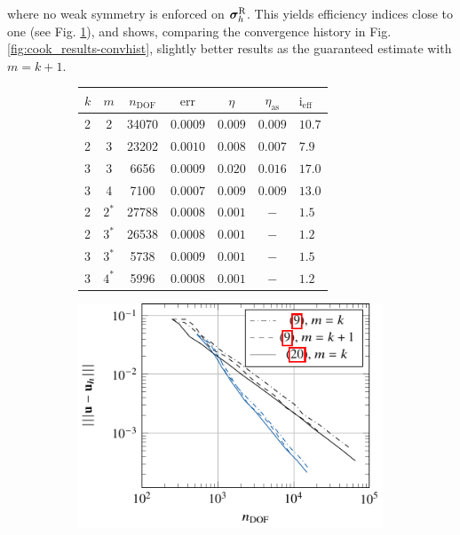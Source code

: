where no weak symmetry is enforced on $\bm{\sigma}^{\mathrm{R}}_h$.
This yields efficiency indices close to one (see Fig. \ref{fig:cook_results-summary}), and shows, comparing the convergence history in Fig. \ref{fig:cook_results-convhist}, slightly better results as the guaranteed estimate with $m=k+1$.
\begin{figure}
    \centering
    \begin{subfigure}[b]{0.4\textwidth}
        \begin{tabular}{@{}l|c|c|ccc|l@{}}
            \toprule
            $k$ & $m$ & $n_\mathrm{DOF}$ & $\mathrm{err}$ & $\eta$ & $\eta _\mathrm{as}$ & $\mathrm{i_{eff}}$ \\ \midrule
            2 & 2 & 34070 & $0.0009$ & $0.009$ & $0.009$ & $10.7$ \\
            2 & 3 & 23202 & $0.0010$ & $0.008$ & $0.007$ & $7.9$ \\
            3 & 3 & 6656  & $0.0009$ & $0.020$ & $0.016$ & $17.0$ \\
            3 & 4 & 7100  & $0.0007$ & $0.009$ & $0.009$ & $13.0$ \\ \midrule
            2 & $2^*$ & 27788 & $0.0008$ & $0.001$ & $-$ & $1.5$ \\
            2 & $3^*$ & 26538 & $0.0008$ & $0.001$ & $-$ & $1.2$ \\
            3 & $3^*$ & 5738  & $0.0009$ & $0.001$ & $-$ & $1.5$ \\
            3 & $4^*$ & 5996  & $0.0008$ & $0.001$ & $-$ & $1.2$ \\ \bottomrule
        \end{tabular}
        \vspace{1.1cm}
        \caption{}
        \label{fig:cook_results-summary}
    \end{subfigure}
    \hfill
    \begin{subfigure}[b]{0.58\textwidth}
        \centering
        \includegraphics[scale=1.0]{fig_cook-convhistory.pdf}

\end{subfigure}
\end{figure}

